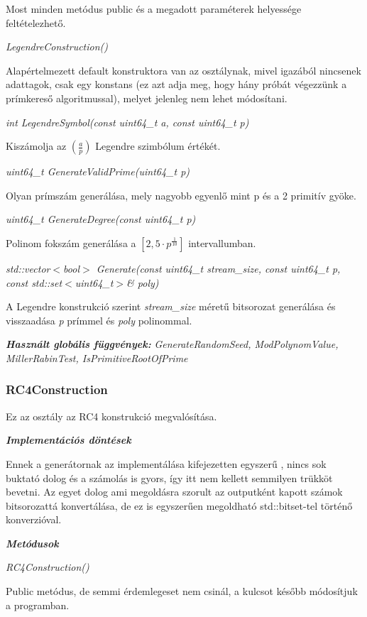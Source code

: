 \documentclass[12pt]{article}
\begin{document}
Most minden metódus public és a megadott paraméterek helyessége feltételezhető.

\textit{LegendreConstruction()}

Alapértelmezett default konstruktora van az osztálynak, mivel igazából nincsenek adattagok, csak egy konstans (ez azt adja meg, hogy hány próbát végezzünk a prímkereső algoritmussal), melyet jelenleg nem lehet módosítani.

\textit{int LegendreSymbol(const uint64\_t a, const uint64\_t p)}

Kiszámolja az $\left({\frac{a}{p}}\right)$ Legendre szimbólum értékét.

\textit{uint64\_t GenerateValidPrime(uint64\_t p)}

Olyan prímszám generálása, mely nagyobb egyenlő mint p és a 2 primitív gyöke.

\textit{uint64\_t GenerateDegree(const uint64\_t p)}

Polinom fokszám generálása a $[2, 5\cdot p^\frac{1}{10}]$ intervallumban.

\textit{std::vector$<$bool$>$ Generate(const uint64\_t stream\_size, const uint64\_t p, const std::set$<$uint64\_t$>$\& poly)}

A Legendre konstrukció szerint \textit{stream\_size} méretű bitsorozat generálása és visszaadása \textit{p} prímmel és \textit{poly} polinommal.

\textbf{\textit{Használt globális függvények: }}\textit{GenerateRandomSeed, ModPolynomValue, MillerRabinTest, IsPrimitiveRootOfPrime}

\subsubsection*{RC4Construction}
Ez az osztály az RC4 konstrukció megvalósítása.

\textbf{\textit{Implementációs döntések}}

Ennek a generátornak az implementálása kifejezetten egyszerű , nincs sok buktató dolog és a számolás is gyors, így itt nem kellett semmilyen trükköt bevetni. Az egyet dolog ami megoldásra szorult az outputként kapott számok bitsorozattá konvertálása, de ez is egyszerűen megoldható std::bitset-tel történő konverzióval.

\textbf{\textit{Metódusok}}

\textit{RC4Construction()}

Public metódus, de semmi érdemlegeset nem csinál, a kulcsot később módosítjuk a programban.
\end{document}
